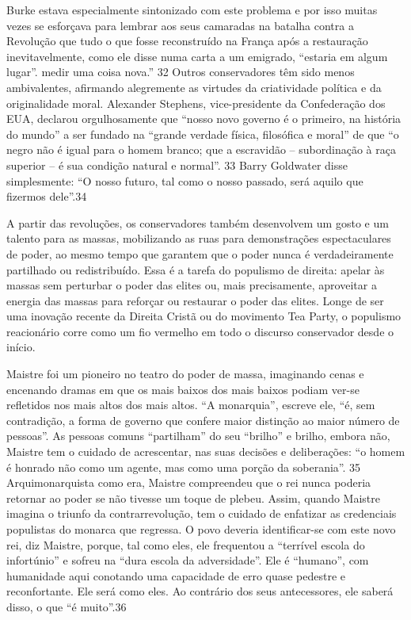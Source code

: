  \par 
Burke estava especialmente sintonizado com este problema e por isso muitas vezes se esforçava para lembrar aos seus camaradas na batalha contra a Revolução que tudo o que fosse reconstruído na França após a restauração inevitavelmente, como ele disse numa carta a um emigrado, “estaria em algum lugar”. medir uma coisa nova.” {\color{blue}32} Outros conservadores têm sido menos ambivalentes, afirmando alegremente as virtudes da criatividade política e da originalidade moral. Alexander Stephens, vice-presidente da Confederação dos EUA, declarou orgulhosamente que “nosso novo governo é o primeiro, na história do mundo” a ser fundado na “grande verdade física, filosófica e moral” de que “o negro não é igual para o homem branco; que a escravidão – subordinação à raça superior – é sua condição natural e normal”. {\color{blue}33} Barry Goldwater disse simplesmente: “O nosso futuro, tal como o nosso passado, será aquilo que fizermos dele”.{\color{blue}34}
 \par 
A partir das revoluções, os conservadores também desenvolvem um gosto e um talento para as massas, mobilizando as ruas para demonstrações espectaculares de poder, ao mesmo tempo que garantem que o poder nunca é verdadeiramente partilhado ou redistribuído. Essa é a tarefa do populismo de direita: apelar às massas sem perturbar o poder das elites ou, mais precisamente, aproveitar a energia das massas para reforçar ou restaurar o poder das elites. Longe de ser uma inovação recente da Direita Cristã ou do movimento Tea Party, o populismo reacionário corre como um fio vermelho em todo o discurso conservador desde o início.
 \par 
Maistre foi um pioneiro no teatro do poder de massa, imaginando cenas e encenando dramas em que os mais baixos dos mais baixos podiam ver-se refletidos nos mais altos dos mais altos. “A monarquia”, escreve ele, “é, sem contradição, a forma de governo que confere maior distinção ao maior número de pessoas”. As pessoas comuns “partilham” do seu “brilho” e brilho, embora não, Maistre tem o cuidado de acrescentar, nas suas decisões e deliberações: “o homem é honrado não como um agente, mas como uma porção da soberania”. {\color{blue}35} Arquimonarquista como era, Maistre compreendeu que o rei nunca poderia retornar ao poder se não tivesse um toque de plebeu. Assim, quando Maistre imagina o triunfo da contrarrevolução, tem o cuidado de enfatizar as credenciais populistas do monarca que regressa. O povo deveria identificar-se com este novo rei, diz Maistre, porque, tal como eles, ele frequentou a “terrível escola do infortúnio” e sofreu na “dura escola da adversidade”. Ele é “humano”, com humanidade aqui conotando uma capacidade de erro quase pedestre e reconfortante. Ele será como eles. Ao contrário dos seus antecessores, ele saberá disso, o que “é muito”.{\color{blue}36}
